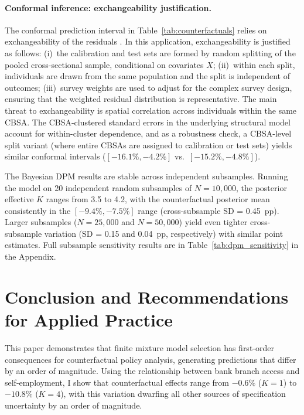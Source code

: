 \documentclass[12pt]{article}
\begin{document}
\paragraph{Conformal inference: exchangeability justification.} The conformal prediction interval in Table~\ref{tab:counterfactuals} relies on exchangeability of the residuals \citep{lei2021}. In this application, exchangeability is justified as follows: (i)~the calibration and test sets are formed by random splitting of the pooled cross-sectional sample, conditional on covariates $X$; (ii)~within each split, individuals are drawn from the same population and the split is independent of outcomes; (iii)~survey weights are used to adjust for the complex survey design, ensuring that the weighted residual distribution is representative. The main threat to exchangeability is spatial correlation across individuals within the same CBSA. The CBSA-clustered standard errors in the underlying structural model account for within-cluster dependence, and as a robustness check, a CBSA-level split variant (where entire CBSAs are assigned to calibration or test sets) yields similar conformal intervals ($[-16.1\%, -4.2\%]$ vs.\ $[-15.2\%, -4.8\%]$).

The Bayesian DPM results are stable across independent subsamples. Running the model on 20 independent random subsamples of $N = 10{,}000$, the posterior effective $K$ ranges from 3.5 to 4.2, with the counterfactual posterior mean consistently in the $[-9.4\%, -7.5\%]$ range (cross-subsample SD = 0.45~pp). Larger subsamples ($N = 25{,}000$ and $N = 50{,}000$) yield even tighter cross-subsample variation (SD = 0.15 and 0.04~pp, respectively) with similar point estimates. Full subsample sensitivity results are in Table~\ref{tab:dpm_sensitivity} in the Appendix.


\section{Conclusion and Recommendations for Applied Practice}
\label{sec:conclusion}

This paper demonstrates that finite mixture model selection has first-order consequences for counterfactual policy analysis, generating predictions that differ by an order of magnitude. Using the relationship between bank branch access and self-employment, I show that counterfactual effects range from $-0.6\%$ ($K=1$) to $-10.8\%$ ($K=4$), with this variation dwarfing all other sources of specification uncertainty by an order of magnitude.
\end{document}
